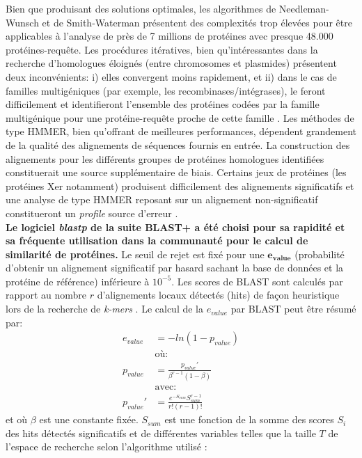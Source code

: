 	 Bien que produisant des solutions optimales, les algorithmes de Needleman-Wunsch et de Smith-Waterman présentent des complexités trop élevées pour être applicables à l'analyse de près de 7 millions de protéines avec presque 48.000 protéines-requête. Les procédures itératives, bien qu'intéressantes dans la recherche d'homologues éloignés (entre chromosomes et plasmides) présentent deux inconvénients: i) elles convergent moins rapidement, et ii) dans le cas de familles multigéniques (par exemple, les recombinases/intégrases), le feront difficilement et identifieront l'ensemble des protéines codées par la famille multigénique pour une protéine-requête proche de cette famille \citep{Guglielmini2013}. Les méthodes de type HMMER, bien qu'offrant de meilleures performances, dépendent grandement de la qualité des alignements de séquences fournis en entrée. La construction des alignements pour les différents groupes de protéines homologues identifiées constituerait une source supplémentaire de biais. Certains jeux de protéines (les protéines Xer notamment) produisent difficilement des alignements significatifs et une analyse de type HMMER reposant sur un alignement non-significatif constitueront un \textit{profile} source d'erreur \citep{wistrand2005improved}.\\
	\textbf{Le logiciel \textit{blastp} de la suite BLAST+ \citep{Camacho2009} a été choisi pour sa rapidité et sa fréquente utilisation dans la communauté pour le calcul de similarité de protéines.} Le seuil de rejet est fixé pour une $\mathbf{e_{value}}$ (probabilité d'obtenir un alignement significatif par hasard sachant la base de données et la protéine de référence) inférieure à $10^{-5}$. Les scores de BLAST sont calculés par rapport au nombre $r$ d'alignements locaux détectés (hits) de façon heuristique lors de la recherche de \textit{k-mers} \citep{korf2003blast}. Le calcul de la $e_{value}$ par BLAST peut être résumé par:
	\begin{equation}
		\begin{split}
			e_{value}&=-ln(1-p_{value})\\
			&\textrm{où:}\\
			p_{value}&=\frac{p_{value}'}{\beta^{r-1}(1-\beta)}\\
			&\textrm{avec:}\\
			p_{value}'&=\frac{e^{-S_{sum}}S_{sum}^{r-1}}{r!(r-1)!}  
		\end{split}
	\end{equation}
et où $\beta$ est une constante fixée. $S_{sum}$ est une fonction de la somme des scores $S_{i}$ des hits détectés significatifs et de différentes variables telles que la taille $T$ de l'espace de recherche selon l'algorithme utilisé \citep{korf2003blast}:
